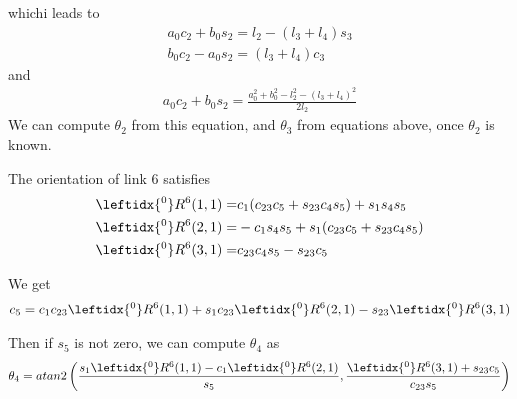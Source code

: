 \documentclass{article}
\begin{document}
whichi leads to
\begin{align}
	a_0c_2+b_0s_2=l_2-(l_3+l_4)s_3\\
	b_0c_2-a_0s_2 = (l_3+l_4)c_3
\end{align}
and
\begin{align}
	a_0c_2+b_0s_2 = \frac{a_0^2 + b_0^2 - l_2^2 - (l_3 + l_4)^2}{2l_2}
\end{align}
We can compute $\theta_2$ from this equation, and $\theta_3$ from equations above, once $\theta_2$ is known.

The orientation of link 6 satisfies
\begin{align}
	\leftidx{^0}R^6(1,1) = &c_1(c_{23}c_5 + s_{23}c_4s_5) + s_1s_4s_5\\
	\leftidx{^0}R^6(2,1) = &-c_1s_4s_5 + s_1(c_{23}c_5 + s_{23}c_4s_5)\\
	\leftidx{^0}R^6(3,1) = &c_{23}c_4s_5 - s_{23}c_5
\end{align}

We get
\begin{align}
	c_5 = c_1c_{23}\leftidx{^0}R^6(1,1) + s_1c_{23}\leftidx{^0}R^6(2,1)-s_{23}\leftidx{^0}R^6(3,1)
\end{align}

Then if $s_5$ is not zero, we can compute $\theta_4$ as
\begin{align}
	\theta_4 = atan2\left(\frac{s_1\leftidx{^0}R^6(1,1)-c_1\leftidx{^0}R^6(2,1)}{s_5},\frac{\leftidx{^0}R^6(3,1)+s_{23}c_5}{c_{23}s_5}\right)
\end{align}
\end{document}
